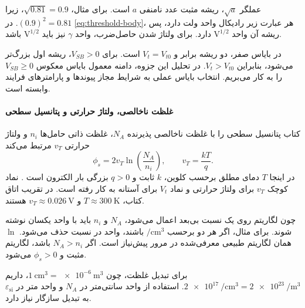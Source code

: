 عملگر \(\sqrt{a}\)، ریشه مثبت عدد نامنفی \(a\) است. برای مثال،
\(\sqrt{0.81}=0.9\)، زیرا \((0.9)^2=0.81\).
در \eqref{eq:threshold-body}، هر عبارت زیر رادیکال واحد ولت دارد، پس
ریشه آن واحد \(\mathrm{V}^{1/2}\) دارد. برای ولتاژ شدن حاصل‌ضرب، واحد
\(\gamma\) نیز باید \(\mathrm{V}^{1/2}\) باشد.

در بایاس صفر، دو ریشه برابر و \(V_t=V_{t0}\) است. برای
\(V_{SB}>0\)، ریشه اول بزرگ‌تر می‌شود، بنابراین \(V_t>V_{t0}\).
در تحلیل این جزوه، دامنه معمول بایاس معکوس \(V_{SB}\ge0\) را به کار
می‌بریم. انتخاب بایاس عملی به شرایط مجاز پیوندها و پارامترهای فرایند
وابسته است.

\paragraph*{غلظت ناخالصی، ولتاژ حرارتی و پتانسیل سطحی}
کتاب پتانسیل سطحی را با غلظت ناخالصی پذیرنده \(N_A\)، غلظت ذاتی
حامل‌ها \(n_i\) و ولتاژ حرارتی \(v_T\) مرتبط می‌کند
\begin{equation}
 \phi_s=2v_T\ln\!\left(\frac{N_A}{n_i}\right),\qquad
 v_T=\frac{kT}{q}.
 \label{eq:threshold-surface-potential}
\end{equation}
در اینجا \(T\) دمای مطلق برحسب کلوین، \(k\) ثابت  و
\(q>0\) بزرگی بار الکترون است
\cite[رابطه  و مثال ]{weste}.
نماد کوچک \(v_T\) برای ولتاژ حرارتی و نماد \(V_t\) برای آستانه به کار
رفته است. در تقریب اتاق کتاب، \(T\approx\qty{300}{\kelvin}\) و
\(v_T\approx\qty{0.026}{\volt}\) هستند.

چون لگاریتم روی یک نسبت بی‌بعد اعمال می‌شود، \(N_A\) و \(n_i\) باید
با واحد یکسان نوشته شوند. برای مثال، اگر هر دو برحسب
\(\unit{\per\centi\metre\cubed}\) باشند، واحد در نسبت حذف می‌شود.
\(\ln\) همان لگاریتم طبیعی معرفی‌شده در مرور پیش‌نیاز است.
اگر \(N_A>n_i\) باشد، لگاریتم مثبت و \(\phi_s>0\) می‌شود.

برای تبدیل غلظت، چون \(\qty{1}{\centi\metre\cubed}
=\qty{e-6}{\metre\cubed}\)، داریم
\(\qty{2e17}{\per\centi\metre\cubed}
=\qty{2e23}{\per\metre\cubed}\).
استفاده از واحد سانتی‌متر در \(N_A\) و واحد متر در
\(\varepsilon_{\mathrm{si}}\) به تبدیل سازگار نیاز دارد.

